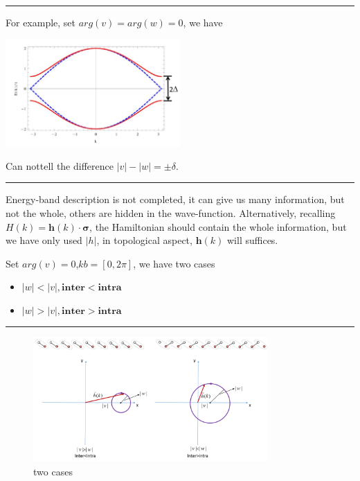 \documentclass[letterpaper,10pt,english]{sphinxmanual}
\begin{document}
\bigskip\hrule{}\bigskip


For example, set \(arg(v)=arg(w)=0\), we have 

\includegraphics[width=0.5\textwidth]{energy.png}

Can nottell the difference \(|v|-|w|=\pm\delta\).


\bigskip\hrule{}\bigskip


Energy-band description is not completed, it can give us many
information, but not the whole, others are hidden in the wave-function.
Alternatively, recalling \(H(k)=\mathbf{h}(k)\cdot \mathbf{\sigma}\), the
Hamiltonian should contain the whole information, but we have only used
\(|h|\), in topological aspect, \(\mathbf{h}(k)\) will suffices.

Set \(arg(v)=0\),\(kb=[0,2\pi]\), we have two cases
\begin{itemize}
\item {}
\(|w|<|v|, \mathbf{inter}<\mathbf{intra}\)

\item {}
\(|w|>|v|, \mathbf{inter}>\mathbf{intra}\)

\end{itemize}


\bigskip\hrule{}\bigskip

\begin{figure}[htbp]
\centering
\capstart

\includegraphics[width=0.8\textwidth]{two.png}
\caption{two cases}\end{figure}
\end{document}
